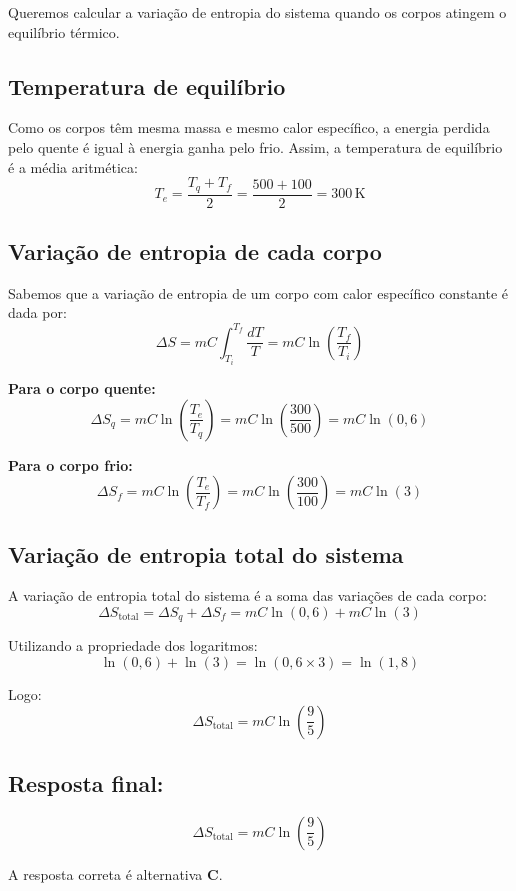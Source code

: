 \begin{flushleft}
Queremos calcular a variação de entropia do sistema quando os corpos atingem o equilíbrio térmico.

\subsection*{Temperatura de equilíbrio}

Como os corpos têm mesma massa e mesmo calor específico, a energia perdida pelo quente é igual à energia ganha pelo frio. Assim, a temperatura de equilíbrio é a média aritmética:
\[
T_e = \frac{T_q + T_f}{2} = \frac{500 + 100}{2} = 300\,\mathrm{K}
\]

\subsection*{Variação de entropia de cada corpo}

Sabemos que a variação de entropia de um corpo com calor específico constante é dada por:
\[
\Delta S = mC \int_{T_i}^{T_f} \frac{dT}{T} = mC \ln\left( \frac{T_f}{T_i} \right)
\]

\textbf{Para o corpo quente:}
\[
\Delta S_q =
mC \ln\left( \frac{T_e}{T_q} \right) =
mC \ln\left( \frac{300}{500} \right) =
mC \ln(0{,}6)
\]

\textbf{Para o corpo frio:}
\[
\Delta S_f =
mC \ln\left( \frac{T_e}{T_f} \right) =
mC \ln\left( \frac{300}{100} \right) =
mC \ln(3)
\]

\subsection*{Variação de entropia total do sistema}

A variação de entropia total do sistema é a soma das variações de cada corpo:
\[
\Delta S_\text{total} =
\Delta S_q + \Delta S_f =
mC \ln(0{,}6) + mC \ln(3)
\]

Utilizando a propriedade dos logaritmos:
\[
\ln(0{,}6) + \ln(3) = \ln(0{,}6 \times 3) = \ln(1{,}8)
\]

Logo:
\[
\Delta S_\text{total} =
mC \ln(\frac{9}{5})
\]

\subsection*{Resposta final:}
\[
\boxed{
\Delta S_\text{total} =
mC \ln(\frac{9}{5})
}
\]

A resposta correta é alternativa \colorbox{green!50}{\textbf{C}}.
\end{flushleft}

